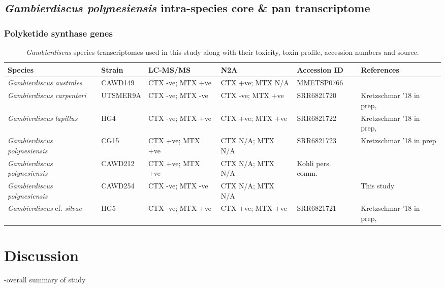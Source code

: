 \documentclass[12pt]{article}
\begin{document}
\subsection*{\emph{Gambierdiscus polynesiensis} intra-species core \& pan transcriptome}

\subsubsection*{Polyketide synthase genes}
\begin{table}
\caption{\emph{Gambierdiscus} species transcriptomes used in this study along with their toxicity, toxin profile, accession numbers and source.}
\label{tbl:SeqTable}
\begin{tabular}{ | p{3cm} | p{2cm} | p{2.5cm} | p{2.5cm} | p{2cm} | p{2cm}|}
\hline
\textbf{Species} & \textbf{Strain}& \textbf{LC-MS/MS} & \textbf{N2A
} & \textbf{Accession ID} & \textbf{References} \\
\hline
\textit{Gambierdiscus australes}&CAWD149& CTX -ve; MTX +ve&CTX +ve; MTX N/A&MMETSP0766&\cite{keeling2014marine,rhodes2010toxic,rhodes2014production}\\
\hline
\textit{Gambierdiscus carpenteri}&UTSMER9A&CTX -ve; MTX -ve&CTX -ve; MTX +ve&SRR6821720
&Kretzschmar '18 in prep, \cite{larsson2018toxicology}\\
\hline
\textit{Gambierdiscus lapillus}&HG4&CTX -ve; MTX +ve&CTX +ve; MTX +ve&SRR6821722
&Kretzschmar '18 in prep, \cite{larsson2018toxicology,kretzschmar2017characterization}\\
\hline
\textit{Gambierdiscus polynesiensis}&CG15&CTX +ve; MTX +ve&CTX N/A; MTX N/A&SRR6821723
&Kretzschmar '18 in prep\\
\hline
\textit{Gambierdiscus polynesiensis}&CAWD212&CTX +ve; MTX +ve&CTX N/A; MTX N/A&Kohli pers. comm.&\cite{rhodes2014production}\\
\hline
\textit{Gambierdiscus polynesiensis}&CAWD254&CTX -ve; MTX -ve&CTX N/A; MTX N/A&&This study\\
\hline
\textit{Gambierdiscus} cf. \textit{silvae}&HG5&CTX -ve; MTX +ve&CTX +ve; MTX +ve&SRR6821721
&Kretzschmar '18 in prep, \cite{larsson2018toxicology,kretzschmar2017characterization}\\
\hline
\end{tabular}
\end{table}
\FloatBarrier
\newpage
\section*{Discussion}
-overall summary of study
\end{document}

